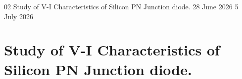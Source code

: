 \begin{refsection}

    \GenerateCoverPage
    {02} %
    {Study of V-I Characteristics of Silicon PN Junction diode.} %
    {28 June 2026} %
    {5 July 2026} %
    \noindent

    \chapter{Study of V-I Characteristics of Silicon PN Junction diode.}

    
    
    
    
    
    
    
    
    
    

\end{refsection}
